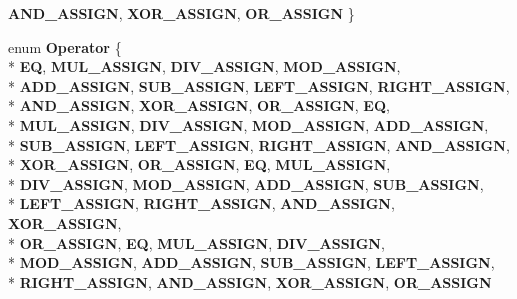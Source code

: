 \begin{DoxyCompactItemize}
{\bfseries A\-N\-D\-\_\-\-A\-S\-S\-I\-G\-N}, 
{\bfseries X\-O\-R\-\_\-\-A\-S\-S\-I\-G\-N}, 
{\bfseries O\-R\-\_\-\-A\-S\-S\-I\-G\-N}
 \}
\item 
enum {\bfseries Operator} \{ \\*
{\bfseries E\-Q}, 
{\bfseries M\-U\-L\-\_\-\-A\-S\-S\-I\-G\-N}, 
{\bfseries D\-I\-V\-\_\-\-A\-S\-S\-I\-G\-N}, 
{\bfseries M\-O\-D\-\_\-\-A\-S\-S\-I\-G\-N}, 
\\*
{\bfseries A\-D\-D\-\_\-\-A\-S\-S\-I\-G\-N}, 
{\bfseries S\-U\-B\-\_\-\-A\-S\-S\-I\-G\-N}, 
{\bfseries L\-E\-F\-T\-\_\-\-A\-S\-S\-I\-G\-N}, 
{\bfseries R\-I\-G\-H\-T\-\_\-\-A\-S\-S\-I\-G\-N}, 
\\*
{\bfseries A\-N\-D\-\_\-\-A\-S\-S\-I\-G\-N}, 
{\bfseries X\-O\-R\-\_\-\-A\-S\-S\-I\-G\-N}, 
{\bfseries O\-R\-\_\-\-A\-S\-S\-I\-G\-N}, 
{\bfseries E\-Q}, 
\\*
{\bfseries M\-U\-L\-\_\-\-A\-S\-S\-I\-G\-N}, 
{\bfseries D\-I\-V\-\_\-\-A\-S\-S\-I\-G\-N}, 
{\bfseries M\-O\-D\-\_\-\-A\-S\-S\-I\-G\-N}, 
{\bfseries A\-D\-D\-\_\-\-A\-S\-S\-I\-G\-N}, 
\\*
{\bfseries S\-U\-B\-\_\-\-A\-S\-S\-I\-G\-N}, 
{\bfseries L\-E\-F\-T\-\_\-\-A\-S\-S\-I\-G\-N}, 
{\bfseries R\-I\-G\-H\-T\-\_\-\-A\-S\-S\-I\-G\-N}, 
{\bfseries A\-N\-D\-\_\-\-A\-S\-S\-I\-G\-N}, 
\\*
{\bfseries X\-O\-R\-\_\-\-A\-S\-S\-I\-G\-N}, 
{\bfseries O\-R\-\_\-\-A\-S\-S\-I\-G\-N}, 
{\bfseries E\-Q}, 
{\bfseries M\-U\-L\-\_\-\-A\-S\-S\-I\-G\-N}, 
\\*
{\bfseries D\-I\-V\-\_\-\-A\-S\-S\-I\-G\-N}, 
{\bfseries M\-O\-D\-\_\-\-A\-S\-S\-I\-G\-N}, 
{\bfseries A\-D\-D\-\_\-\-A\-S\-S\-I\-G\-N}, 
{\bfseries S\-U\-B\-\_\-\-A\-S\-S\-I\-G\-N}, 
\\*
{\bfseries L\-E\-F\-T\-\_\-\-A\-S\-S\-I\-G\-N}, 
{\bfseries R\-I\-G\-H\-T\-\_\-\-A\-S\-S\-I\-G\-N}, 
{\bfseries A\-N\-D\-\_\-\-A\-S\-S\-I\-G\-N}, 
{\bfseries X\-O\-R\-\_\-\-A\-S\-S\-I\-G\-N}, 
\\*
{\bfseries O\-R\-\_\-\-A\-S\-S\-I\-G\-N}, 
{\bfseries E\-Q}, 
{\bfseries M\-U\-L\-\_\-\-A\-S\-S\-I\-G\-N}, 
{\bfseries D\-I\-V\-\_\-\-A\-S\-S\-I\-G\-N}, 
\\*
{\bfseries M\-O\-D\-\_\-\-A\-S\-S\-I\-G\-N}, 
{\bfseries A\-D\-D\-\_\-\-A\-S\-S\-I\-G\-N}, 
{\bfseries S\-U\-B\-\_\-\-A\-S\-S\-I\-G\-N}, 
{\bfseries L\-E\-F\-T\-\_\-\-A\-S\-S\-I\-G\-N}, 
\\*
{\bfseries R\-I\-G\-H\-T\-\_\-\-A\-S\-S\-I\-G\-N}, 
{\bfseries A\-N\-D\-\_\-\-A\-S\-S\-I\-G\-N}, 
{\bfseries X\-O\-R\-\_\-\-A\-S\-S\-I\-G\-N}, 
{\bfseries O\-R\-\_\-\-A\-S\-S\-I\-G\-N}

\end{DoxyCompactItemize}
